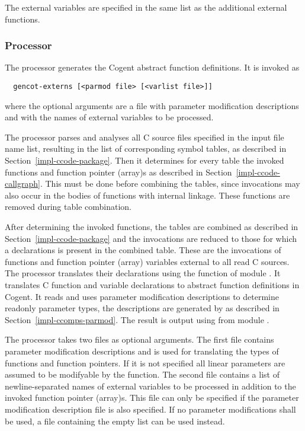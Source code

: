 The external variables are specified in the same list as the additional external functions.

\subsubsection{Processor }

The processor  generates the Cogent abstract function definitions. It is invoked as
\begin{verbatim}
  gencot-externs [<parmod file> [<varlist file>]]
\end{verbatim}
where the optional arguments are a file with parameter modification descriptions and with the names of external
variables to be processed.

The processor parses and analyses
all C source files specified in the input file name list, resulting in the list of corresponding symbol tables, as
described in Section~\ref{impl-ccode-package}. Then
it determines for every table the invoked functions and function pointer (array)s as described in 
Section~\ref{impl-ccode-callgraph}. This must
be done before combining the tables, since invocations may also occur in the bodies of functions with internal
linkage. These functions are removed during table combination.

After determining the invoked functions, the tables are combined as described in Section~\ref{impl-ccode-package}
and the invocations are reduced to those for
which a declarations is present in the combined table. These are the invocations of functions and function
pointer (array) variables external to all
read C sources. The processor translates their declarations using the function  of
module . It translates C function and variable declarations to abstract function 
definitions
in Cogent. It reads and uses parameter modification descriptions to determine readonly parameter types, the
descriptions are generated by  as described in Section~\ref{impl-ccomps-parmod}.
The result is output using  from module .

The processor takes two files as optional arguments. The first file contains parameter modification descriptions
and is used for translating the types of functions and function pointers. If it is not specified all linear
parameters are assumed to be modifyable by the function. The second file contains a list of newline-separated 
names of external variables to be processed in addition to the invoked function pointer (array)s. This file can
only be specified if the parameter modification description file is also specified. If no parameter modifications
shall be used, a file containing the empty list \code{[]} can be used instead.

